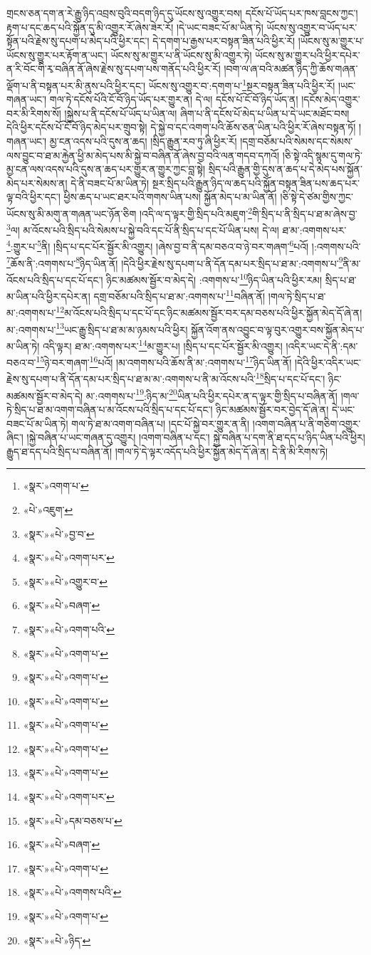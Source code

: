 གྲངས་ཅན་དག་ན་རེ་རྒྱུ་ཉིད་འབྲས་བུའི་བདག་ཉིད་དུ་ཡོངས་སུ་འགྱུར་བས། དངོས་པོ་ཡོད་པར་ཁས་བླངས་ཀྱང་། རྟག་པ་དང་ཆད་པའི་སྐྱོན་དུ་མི་འགྱུར་རོ་ཞེས་ཟེར་རོ། །དེ་ཡང་བཟང་པོ་མ་ཡིན་ཏེ། ཡོངས་སུ་འགྱུར་བ་ཡོད་པར་སྟོན་པའི་རྗེས་སུ་དཔག་པ་མེད་པའི་ཕྱིར་དང་། དེ་དགག་པ་རྒྱས་པར་བསྟན་ཟིན་པའི་ཕྱིར་རོ། །ཡོངས་སུ་མ་གྱུར་པ་ཡོངས་སུ་གྱུར་པར་རྟོག་ན་ཡང་། ཡོངས་སུ་མ་གྱུར་པ་ནི་ཡོངས་སུ་མི་འགྱུར་ཏེ། ཡོངས་སུ་མ་གྱུར་པའི་ཕྱིར་དཔེར་ན་རི་བོང་གི་རྭ་བཞིན་ནོ་ཞེས་རྗེས་སུ་དཔག་པས་གནོད་པའི་ཕྱིར་རོ། །བག་ལ་ཞ་བའི་མཚན་ཉིད་ཀྱི་ཆོས་གཞན་ལྡོག་པ་ནི་བསྟན་པར་མི་ནུས་པའི་ཕྱིར་དང་། ཡོངས་སུ་འགྱུར་བ་:དགག་པ་\footnote{«སྣར་»འགག་པ་}སྔར་བསྟན་ཟིན་པའི་ཕྱིར་རོ། །ཡང་གཞན་ཡང་། གལ་ཏེ་དངོས་པོའི་ངོ་བོ་ཉིད་ཡོད་པར་གྱུར་ན། དེ་ལ། དངོས་པོ་ངོ་བོ་ཉིད་ཡོད་ན། །དངོས་མེད་འགྱུར་བར་མི་རིགས་སོ། །སྐྱེས་པ་ནི་དངོས་པོ་ཡོད་པ་ཡིན་ལ། ཞིག་པ་ནི་དངོས་པོ་མེད་པ་ཡིན་པ་དེ་ཡང་མཐོང་བས། དེའི་ཕྱིར་དངོས་པོ་ངོ་བོ་ཉིད་མེད་པར་གྲུབ་སྟེ། དེ་སྐྱེ་བ་དང་འགག་པའི་ཆོས་ཅན་ཡིན་པའི་ཕྱིར་རོ་ཞེས་བསྟན་ཏོ། །གཞན་ཡང་། མྱ་ངན་འདས་པའི་དུས་ན་ཆད། །སྲིད་རྒྱུན་རབ་ཏུ་ཞི་ཕྱིར་རོ། །དགྲ་བཅོམ་པའི་སེམས་དང་སེམས་ལས་བྱུང་བ་ཐ་མ་རྐྱེན་ཕྱི་མ་མེད་པས་མི་སྐྱེ་བ་བཞིན་ནོ་ཞེས་བྱ་བའི་ལན་གདབ་དཀའོ། །ཅི་སྟེ་འདི་སྙམ་དུ་གལ་ཏེ་མྱ་ངན་ལས་འདས་པའི་དུས་ན་ཆད་པར་གྱུར་ན་གྱུར་ཀྱང་བླ་སྟེ། སྲིད་པའི་རྒྱུན་གྱི་དུས་ན་ཆད་པ་དེ་མེད་པས་སྐྱོན་མེད་པར་སེམས་ན། དེ་ནི་བཟང་པོ་མ་ཡིན་ཏེ། སྔར་སྲིད་པའི་རྒྱུན་ཉིད་ལ་ཆད་པའི་སྐྱོན་བསྟན་ཟིན་པས་ཆད་པར་ལྟ་བའི་ཕྱིར་དང་། ཕྱིས་ཆད་པ་ཡང་ཐར་པའི་གགས་ཡིན་པས། སྐྱོན་མེད་པ་མ་ཡིན་ནོ། །ཅི་སྟེ་དེ་ཙམ་གྱིས་ཀྱང་ཡོངས་སུ་མི་མགུ་ན་གཞན་ཡང་ཉོན་ཅིག །འདི་ལ་ད་ལྟར་གྱི་སྲིད་པའི་མཇུག་\footnote{«པེ་»འཇུག་}གི་སྲིད་པ་ནི་སྲིད་པ་ཐ་མ་ཞེས་བྱ་\footnote{«སྣར་»«པེ་»བྱ་བ་}ལ། མ་འོངས་པའི་སྲིད་པའི་སེམས་པ་སྐྱེ་བའི་དང་པོ་ནི་སྲིད་པ་དང་པོ་ཡིན་པས། དེ་ལ། ཐ་མ་:འགགས་པར་\footnote{«སྣར་»«པེ་»འགག་པར་}:གྱུར་པ་\footnote{«སྣར་»«པེ་»འགྱུར་བ་}ནི། །སྲིད་པ་དང་པོར་སྦྱོར་མི་འགྱུར། །ཞེས་བྱ་བ་ནི་དམ་བཅའ་བ་ཉེ་བར་གཞག་\footnote{«སྣར་»«པེ་»བཞག་}པའོ། །:འགགས་པའི་\footnote{«སྣར་»«པེ་»འགག་པའི་}ཆོས་ནི་:འགགས་པ་\footnote{«སྣར་»«པེ་»འགག་པ་}ཉིད་ཡིན་ནོ། །དེའི་ཕྱིར་རྗེས་སུ་དཔག་པ་ནི་དོན་དམ་པར་སྲིད་པ་ཐ་མ་:འགགས་པ་\footnote{«སྣར་»«པེ་»འགག་པ་}ནི་མ་འོངས་པའི་སྲིད་པ་དང་པོ་དང་། ཉིང་མཚམས་སྦྱོར་བ་མེད་དེ། :འགགས་པ་\footnote{«སྣར་»«པེ་»འགག་པ་}ཉིད་ཡིན་པའི་ཕྱིར་རམ། སྲིད་པ་ཐ་མ་ཡིན་པའི་ཕྱིར་དཔེར་ན། དགྲ་བཅོམ་པའི་སྲིད་པ་ཐ་མ་:འགགས་པ་\footnote{«སྣར་»«པེ་»འགག་པ་}བཞིན་ནོ། །གལ་ཏེ་སྲིད་པ་ཐ་མ་:འགགས་པ་\footnote{«སྣར་»«པེ་»འགག་པ་}མ་འོངས་པའི་སྲིད་པ་དང་པོ་དང་ཉིང་མཚམས་སྦྱོར་བར་དམ་བཅས་པའི་ཕྱིར་སྐྱོན་མེད་དོ་ཞེ་ན། མ་:འགགས་པ་\footnote{«སྣར་»«པེ་»འགག་པ་}ཡང་རྒྱུ་སྲིད་པ་ཐ་མ་མ་ཉམས་པའི་ཕྱིར། སྐྱོན་འོག་ནས་འབྱུང་བ་ལྟ་བུར་འགྱུར་བས་སྐྱོན་མེད་པ་མ་ཡིན་ཏེ། འདི་ལྟར། ཐ་མ་:འགགས་པར་\footnote{«སྣར་»«པེ་»འགག་པར་}མ་གྱུར་པ། །སྲིད་པ་དང་པོར་སྦྱོར་མི་འགྱུར། །འདིར་ཡང་དེ་ནི་:དམ་བཅའ་བ་\footnote{«སྣར་»«པེ་»དམ་བཅས་པ་}ཉེ་བར་གཞག་\footnote{«སྣར་»«པེ་»བཞག་}པའོ། །མ་འགགས་པའི་ཆོས་ནི་མ་:འགགས་པ་\footnote{«སྣར་»«པེ་»འགག་པ་}ཉིད་ཡིན་ནོ། །དེའི་ཕྱིར་འདིར་ཡང་རྗེས་སུ་དཔག་པ་ནི་དོན་དམ་པར་སྲིད་པ་ཐ་མ་མ་:འགགས་པ་ནི་མ་འོངས་པའི་\footnote{«སྣར་»«པེ་»འགགས་པའི་}སྲིད་པ་དང་པོ་དང་། ཉིང་མཚམས་སྦྱོར་བ་མེད་དེ། མ་:འགགས་པ་\footnote{«སྣར་»«པེ་»འགག་པ་}:ཉིད་མ་\footnote{«སྣར་»«པེ་»ཉིད་}ཡིན་པའི་ཕྱིར་དཔེར་ན་ད་ལྟར་གྱི་སྲིད་པ་བཞིན་ནོ། །གལ་ཏེ་སྲིད་པ་ཐ་མ་འགག་བཞིན་པ་མ་འོངས་པའི་སྲིད་པ་དང་པོ་དང་། ཉིང་མཚམས་སྦྱོར་བར་བྱེད་དོ་ཞེ་ན། དེ་ཡང་བཟང་པོ་མ་ཡིན་ཏེ། གལ་ཏེ་ཐ་མ་འགག་བཞིན་པ། །དང་པོ་སྐྱེ་བར་གྱུར་ན་ནི། །འགག་བཞིན་པ་ནི་གཅིག་འགྱུར་ཞིང་། །སྐྱེ་བཞིན་པ་ཡང་གཞན་དུ་འགྱུར། །འགག་བཞིན་པ་དང་། སྐྱེ་བཞིན་པ་དག་ནི་ཐ་དད་པ་ཉིད་ཡིན་པའི་ཕྱིར། རྒྱུད་ཐ་དད་པའི་སྲིད་པ་བཞིན་ནོ། །གལ་ཏེ་དེ་ལྟར་འདོད་པའི་ཕྱིར་སྐྱོན་མེད་དོ་ཞེ་ན། དེ་ནི་མི་རིགས་ཏེ། 